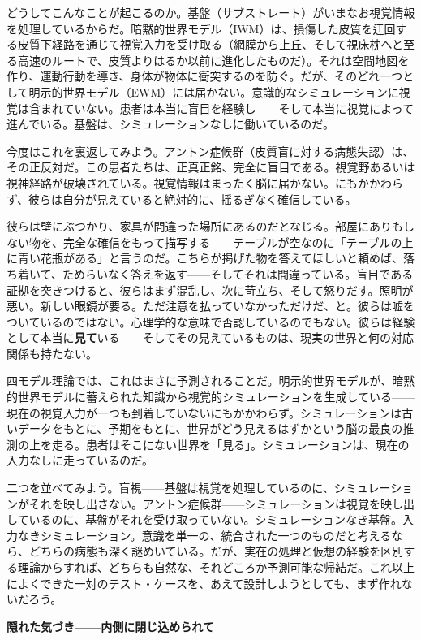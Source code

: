 \documentclass[11pt, twoside, openright]{book}
\begin{document}
どうしてこんなことが起こるのか。基盤（サブストレート）がいまなお視覚情報を処理しているからだ。暗黙的世界モデル（IWM）は、損傷した皮質を迂回する皮質下経路を通じて視覚入力を受け取る（網膜から上丘、そして視床枕へと至る高速のルートで、皮質よりはるか以前に進化したものだ）。それは空間地図を作り、運動行動を導き、身体が物体に衝突するのを防ぐ。だが、そのどれ一つとして明示的世界モデル（EWM）には届かない。意識的なシミュレーションに視覚は含まれていない。患者は本当に盲目を経験し------そして本当に視覚によって進んでいる。基盤は、シミュレーションなしに働いているのだ。

今度はこれを裏返してみよう。アントン症候群（皮質盲に対する病態失認）は、その正反対だ。この患者たちは、正真正銘、完全に盲目である。視覚野あるいは視神経路が破壊されている。視覚情報はまったく脳に届かない。にもかかわらず、彼らは自分が見えていると絶対的に、揺るぎなく確信している。

彼らは壁にぶつかり、家具が間違った場所にあるのだとなじる。部屋にありもしない物を、完全な確信をもって描写する------テーブルが空なのに「テーブルの上に青い花瓶がある」と言うのだ。こちらが掲げた物を答えてほしいと頼めば、落ち着いて、ためらいなく答えを返す------そしてそれは間違っている。盲目である証拠を突きつけると、彼らはまず混乱し、次に苛立ち、そして怒りだす。照明が悪い。新しい眼鏡が要る。ただ注意を払っていなかっただけだ、と。彼らは嘘をついているのではない。心理学的な意味で否認しているのでもない。彼らは経験として本当に\textbf{見て}いる------そしてその見えているものは、現実の世界と何の対応関係も持たない。

四モデル理論では、これはまさに予測されることだ。明示的世界モデルが、暗黙的世界モデルに蓄えられた知識から視覚的シミュレーションを生成している------現在の視覚入力が一つも到着していないにもかかわらず。シミュレーションは古いデータをもとに、予期をもとに、世界がどう見えるはずかという脳の最良の推測の上を走る。患者はそこにない世界を「見る」。シミュレーションは、現在の入力なしに走っているのだ。

二つを並べてみよう。盲視------基盤は視覚を処理しているのに、シミュレーションがそれを映し出さない。アントン症候群------シミュレーションは視覚を映し出しているのに、基盤がそれを受け取っていない。シミュレーションなき基盤。入力なきシミュレーション。意識を単一の、統合された一つのものだと考えるなら、どちらの病態も深く謎めいている。だが、実在の処理と仮想の経験を区別する理論からすれば、どちらも自然な、それどころか予測可能な帰結だ。これ以上によくできた一対のテスト・ケースを、あえて設計しようとしても、まず作れないだろう。

\textbf{隠れた気づき------内側に閉じ込められて}
\end{document}
